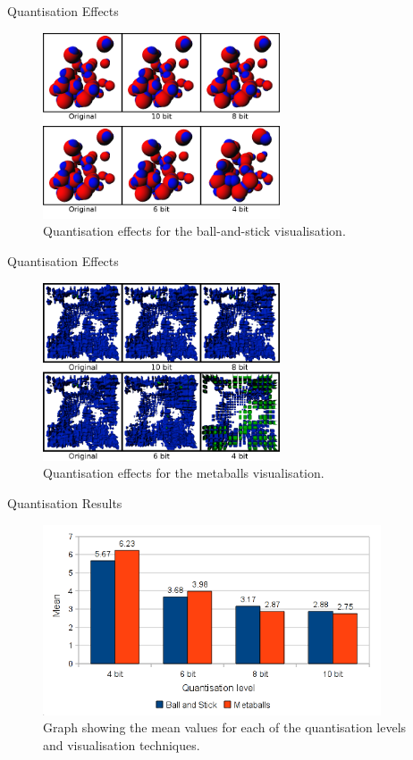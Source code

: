 \documentclass{beamer}
\begin{document}
\begin{frame}{Quantisation Effects}
\begin{figure}
  \centering
  \includegraphics[width=70mm]{min-images/ball-and-stick-4680.png}
  \caption{Quantisation effects for the ball-and-stick visualisation.}
\end{figure}
\end{frame}

\begin{frame}{Quantisation Effects}
\begin{figure}
  \centering
  \includegraphics[width=70mm]{min-images/metaballs-4680.png}
  \caption{Quantisation effects for the metaballs visualisation.}
\end{figure}
\end{frame}

\begin{frame}{Quantisation Results}
\begin{figure}
  \centering
  \includegraphics[width=100mm]{min-images/bm-means.png}
  \caption{Graph showing the mean values for each of the quantisation levels and visualisation techniques.}
\end{figure}
\end{frame}
\end{document}
